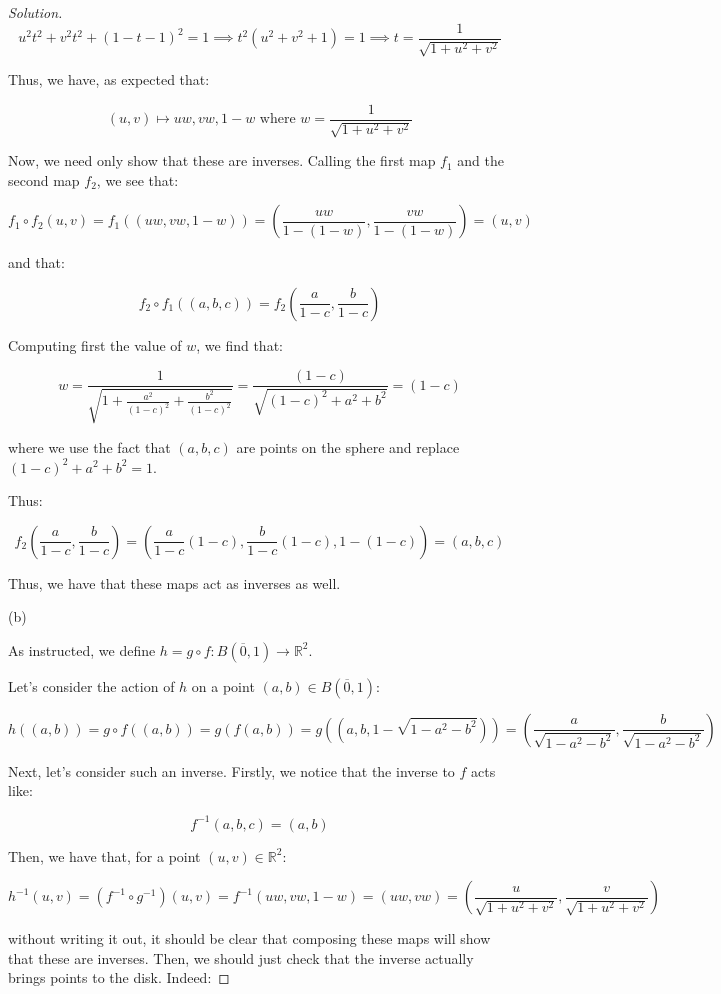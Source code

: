 \documentclass[10pt]{article}
\begin{document}
\begin{proof}[Solution]
$$ u^2 t^2 + v^2 t^2 + (1-t - 1)^2 = 1 \implies t^2(u^2 + v^2 + 1) = 1 \implies t = \frac{1}{\sqrt{1 + u^2 + v^2}} $$

Thus, we have, as expected that:

$$ (u,v) \mapsto uw, vw, 1 - w  \text{ where } w = \frac{1}{\sqrt{1 + u^2 + v^2}} $$

Now, we need only show that these are inverses. Calling the first map $f_1$ and the second map $f_2$, we see that:

$$f_1 \circ f_2(u,v) = f_1( (uw,vw,1-w)) = \left(\frac{uw}{1 -(1-w)}, \frac{vw}{1 - (1-w)} \right) = (u,v) $$

and that:

$$ f_2 \circ f_1((a,b,c)) = f_2\left(\frac{a}{1-c}, \frac{b}{1-c}\right) $$

Computing first the value of $w$, we find that:

$$w = \frac{1}{\sqrt{1 + \frac{a^2}{(1-c)^2} + \frac{b^2}{(1-c)^2}}} = \frac{(1-c)}{\sqrt{(1-c)^2 +a^2 + b^2}} = (1-c) $$

where we use the fact that $(a,b,c)$ are points on the sphere and replace $(1-c)^2 +a^2 + b^2 = 1$.

Thus:

$$  f_2\left(\frac{a}{1-c}, \frac{b}{1-c}\right) = \left(\frac{a}{1-c} (1-c),  \frac{b}{1-c} (1-c), 1 - (1-c) \right) = (a,b,c) $$

Thus, we have that these maps act as inverses as well.

(b)

As instructed, we define $h = g \circ f : B(\overline{0}, 1) \to \mathbb{R}^2$.

Let’s consider the action of $h$ on a point $(a,b) \in B(\overline{0}, 1)$:

$$h((a,b)) = g \circ f ((a,b)) = g(f(a,b)) = g(  (a,b,1 - \sqrt{1 - a^2 - b^2}) ) = \left( \frac{a}{\sqrt{1-a^2 - b^2}}, \frac{b}{\sqrt{1 - a^2 - b^2} } \right)$$

Next, let’s consider such an inverse. Firstly, we notice that the inverse to $f$ acts like:

$$f^{-1} (a,b,c) = (a,b)$$

Then, we have that, for a point $(u,v) \in \mathbb{R}^2$:

$$ h^{-1}(u,v) = (f^{-1} \circ g^{-1})(u,v) = f^{-1} ( uw, vw, 1 - w ) = (uw, vw) = \left(\frac{u}{\sqrt{1 + u^2 + v^2}}, \frac{v}{\sqrt{1 + u^2 + v^2}} \right)$$

without writing it out, it should be clear that composing these maps will show that these are inverses. Then, we should just check that the inverse actually brings points to the disk. Indeed:


\end{proof}
\end{document}
